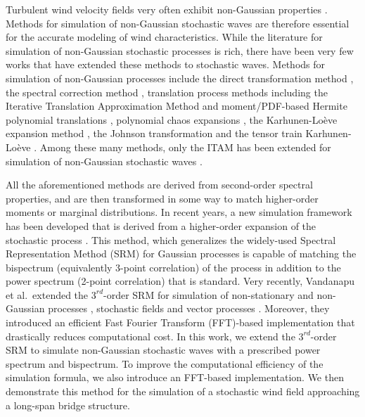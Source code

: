 \documentclass[preprint, review, 12pt]{elsarticle}
\begin{document}
Turbulent wind velocity fields very often exhibit non-Gaussian properties \cite{Huang2016}. Methods for simulation of non-Gaussian stochastic waves are therefore essential for the accurate modeling of wind characteristics. While the literature for simulation of non-Gaussian stochastic processes is rich, there have been very few works that have extended these methods to stochastic waves. Methods for simulation of non-Gaussian processes include the direct transformation method \citep{Gurley1996}, the spectral correction method \citep{Masters2003}, translation process methods \cite{yamazaki1988digital,grigoriu1998simulation,gioffre2000simulation} including the Iterative Translation Approximation Method \citep{Shields2011,shields2013simple,Li2022} and moment/PDF-based Hermite polynomial translations \cite{yang2013probabilistic,yang2015efficient,puig2002non}, polynomial chaos expansions \citep{Sakamoto2002}, the Karhunen-Lo{\`{e}}ve expansion method \citep{Li2007,kim2015modeling}, the Johnson transformation \citep{Ma2016} and the tensor train Karhunen-Lo{\`{e}}ve \citep{Bu2020}. Among these many methods, only the ITAM has been extended for simulation of non-Gaussian stochastic waves \citep{Zhou2020}.


All the aforementioned methods are derived from second-order spectral properties, and are then transformed in some way to match higher-order moments or marginal distributions. In recent years, a new simulation framework has been developed that is derived from a higher-order expansion of the stochastic process \cite{Shields2017}. This method, which generalizes the widely-used Spectral Representation Method (SRM) for Gaussian processes \cite{Shields2017, vandanapu2022simulation, Vandanapu2021} is capable of matching the bispectrum (equivalently 3-point correlation) of the process in addition to the power spectrum (2-point correlation) that is standard. Very recently, Vandanapu et al.\ extended the $3^{rd}$-order SRM for simulation of non-stationary and non-Gaussian processes \cite{vandanapu2022simulation}, stochastic fields and vector processes \cite{Vandanapu2021}. Moreover, they introduced an efficient Fast Fourier Transform (FFT)-based implementation that drastically reduces computational cost. In this work, we extend the $3^{rd}$-order SRM to simulate non-Gaussian stochastic waves with a prescribed power spectrum and bispectrum. To improve the computational efficiency  of the simulation formula, we also introduce an FFT-based implementation. We then demonstrate this method for the simulation of a stochastic wind field approaching a long-span bridge structure.
\end{document}
